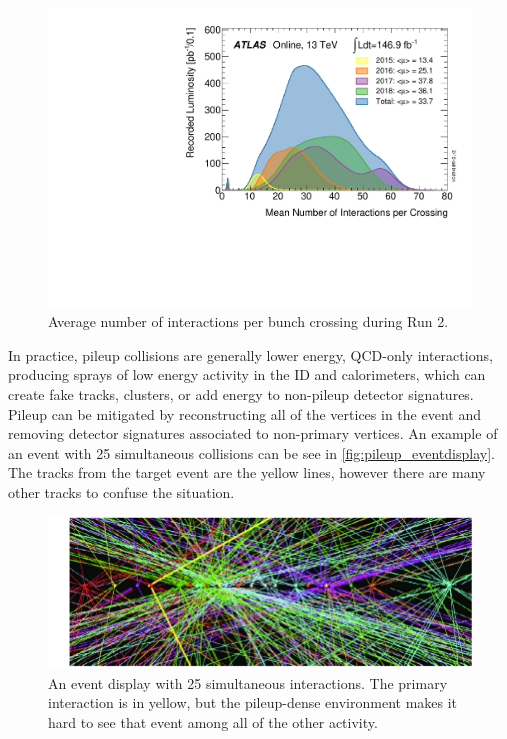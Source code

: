 \begin{figure}[htbp]
\centering
\includegraphics[width=.8\textwidth]{figures/Detector/lhc-mu.pdf}
\caption{Average number of interactions per bunch crossing during Run 2. }
\label{fig:pileup_plot}
\end{figure}

In practice, pileup collisions are generally lower energy, \ac{QCD}-only interactions, producing sprays of low energy activity in the \ac{ID} and calorimeters, which can create fake tracks, clusters, or add energy to non-pileup detector signatures.  Pileup can be mitigated by reconstructing all of the vertices in the event and removing detector signatures associated to non-primary vertices. An example of an event with 25 simultaneous collisions can be see in \autoref{fig:pileup_eventdisplay}. The tracks from the target event are the yellow lines, however there are many other tracks to confuse the situation.


\begin{figure}[htbp]
\centering
\includegraphics[width=.8\textwidth]{figures/Detector/lhc-pileup-eventdisplay.png}
\caption{An event display with 25 simultaneous interactions. The primary interaction is in yellow, but the pileup-dense environment makes it hard to see that event among all of the other activity.}
\label{fig:pileup_eventdisplay}
\end{figure}





